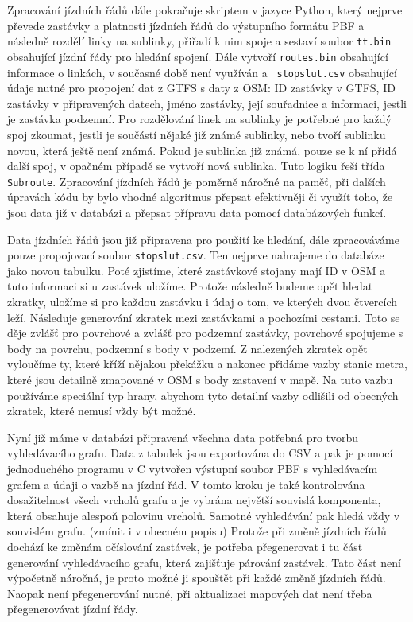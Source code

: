 Zpracování jízdních řádů dále pokračuje skriptem v jazyce Python, který nejprve
převede zastávky a platnosti jízdních řádů do výstupního formátu PBF a následně
rozdělí linky na sublinky, přiřadí k nim spoje a sestaví soubor {\tt tt.bin}
obsahující jízdní řády pro hledání spojení. Dále vytvoří {\tt routes.bin}
obsahující informace o linkách, v současné době není využíván a {\tt
stopslut.csv} obsahující údaje nutné pro propojení dat z GTFS s daty z OSM: ID
zastávky v GTFS, ID zastávky v připravených datech, jméno zastávky, její
souřadnice a informaci, jestli je zastávka podzemní. Pro rozdělování linek na
sublinky je potřebné pro každý spoj zkoumat, jestli je součástí nějaké již známé
sublinky, nebo tvoří sublinku novou, která ještě není známá. Pokud je sublinka
již známá, pouze se k ní přidá další spoj, v opačném případě se vytvoří nová
sublinka. Tuto logiku řeší třída {\tt Subroute}. Zpracování jízdních řádů je
poměrně náročné na paměť, při dalších úpravách kódu by bylo vhodné algoritmus
přepsat efektivněji či využít toho, že jsou data již v databázi a přepsat
přípravu data pomocí databázových funkcí.  

Data jízdních řádů jsou již připravena pro použití ke hledání, dále zpracováváme
pouze propojovací soubor {\tt stopslut.csv}. Ten nejprve nahrajeme do databáze
jako novou tabulku. Poté zjistíme, které zastávkové stojany mají ID v OSM a tuto
informaci si u zastávek uložíme. Protože následně budeme opět hledat zkratky,
uložíme si pro každou zastávku i údaj o tom, ve kterých dvou čtvercích leží.  
Následuje generování zkratek mezi zastávkami a pochozími cestami. Toto se děje
zvlášť pro povrchové a zvlášť pro podzemní zastávky, povrchové spojujeme s body
na povrchu, podzemní s body v podzemí. Z nalezených zkratek opět vyloučíme ty,
které kříží nějakou překážku a nakonec přidáme vazby stanic metra, které jsou
detailně zmapované v OSM s body zastavení v mapě. Na tuto vazbu používáme
speciální typ hrany, abychom tyto detailní vazby odlišili od obecných zkratek,
které nemusí vždy být možné. 

Nyní již máme v databázi připravená všechna data potřebná pro tvorbu
vyhledávacího grafu. Data z tabulek jsou exportována do CSV a pak je pomocí
jednoduchého programu v C vytvořen výstupní soubor PBF s vyhledávacím grafem a
údaji o vazbě na jízdní řád. V tomto kroku je také kontrolována dosažitelnost
všech vrcholů grafu a je vybrána největší souvislá komponenta, která obsahuje
alespoň polovinu vrcholů. Samotné vyhledávání pak hledá vždy v souvislém grafu.
(\TODO zmínit i v obecném popisu) Protože při změně jízdních řádů dochází ke změnám
očíslování zastávek, je potřeba přegenerovat i tu část generování vyhledávacího
grafu, která zajišťuje párování zastávek. Tato část není výpočetně náročná, je
proto možné ji spouštět při každé změně jízdních řádů. Naopak není přegenerování
nutné, při aktualizaci mapových dat není třeba přegenerovávat jízdní řády. 

